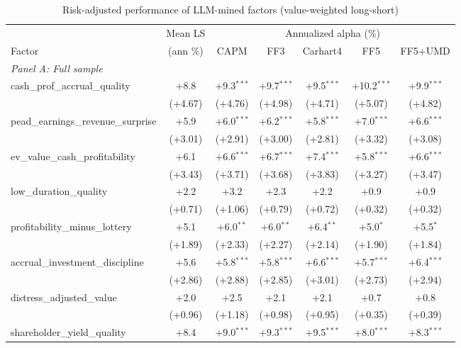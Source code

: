 \begin{table}[htbp]\centering
\caption{Risk-adjusted performance of LLM-mined factors (value-weighted long-short)}
\label{tab:alphas_vw}
\begin{threeparttable}\footnotesize
\begin{tabular}{lcccccc}
\toprule
 & Mean LS & \multicolumn{5}{c}{Annualized alpha (\%)} \\
\cmidrule(lr){3-7}
Factor & (ann \%) & CAPM & FF3 & Carhart4 & FF5 & FF5+UMD \\
\midrule
\multicolumn{7}{l}{\textit{Panel A: Full sample}} \\
\addlinespace
cash\_prof\_accrual\_quality & +8.8 & +9.3$^{***}$ & +9.7$^{***}$ & +9.5$^{***}$ & +10.2$^{***}$ & +9.9$^{***}$ \\
 & (+4.67) & (+4.76) & (+4.98) & (+4.71) & (+5.07) & (+4.82) \\
\addlinespace
pead\_earnings\_revenue\_surprise & +5.9 & +6.0$^{***}$ & +6.2$^{***}$ & +5.8$^{***}$ & +7.0$^{***}$ & +6.6$^{***}$ \\
 & (+3.01) & (+2.91) & (+3.00) & (+2.81) & (+3.32) & (+3.08) \\
\addlinespace
ev\_value\_cash\_profitability & +6.1 & +6.6$^{***}$ & +6.7$^{***}$ & +7.4$^{***}$ & +5.8$^{***}$ & +6.6$^{***}$ \\
 & (+3.43) & (+3.71) & (+3.68) & (+3.83) & (+3.27) & (+3.47) \\
\addlinespace
low\_duration\_quality & +2.2 & +3.2 & +2.3 & +2.2 & +0.9 & +0.9 \\
 & (+0.71) & (+1.06) & (+0.79) & (+0.72) & (+0.32) & (+0.32) \\
\addlinespace
profitability\_minus\_lottery & +5.1 & +6.0$^{**}$ & +6.0$^{**}$ & +6.4$^{**}$ & +5.0$^{*}$ & +5.5$^{*}$ \\
 & (+1.89) & (+2.33) & (+2.27) & (+2.14) & (+1.90) & (+1.84) \\
\addlinespace
accrual\_investment\_discipline & +5.6 & +5.8$^{***}$ & +5.8$^{***}$ & +6.6$^{***}$ & +5.7$^{***}$ & +6.4$^{***}$ \\
 & (+2.86) & (+2.88) & (+2.85) & (+3.01) & (+2.73) & (+2.94) \\
\addlinespace
distress\_adjusted\_value & +2.0 & +2.5 & +2.1 & +2.1 & +0.7 & +0.8 \\
 & (+0.96) & (+1.18) & (+0.98) & (+0.95) & (+0.35) & (+0.39) \\
\addlinespace
shareholder\_yield\_quality & +8.4 & +9.0$^{***}$ & +9.3$^{***}$ & +9.5$^{***}$ & +8.0$^{***}$ & +8.3$^{***}$ \\

\end{tabular}
\end{threeparttable}
\end{table}
